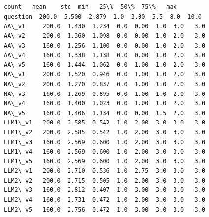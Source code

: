 \documentclass[11pt]{article}
\makeatletter
\newcommand{\boxspacing}{\kern\kvtcb@left@rule\kern\kvtcb@boxsep}
\newcommand{\prompt}[4]{
        {\ttfamily\llap{{\color{#2}[#3]:\hspace{3pt}#4}}\vspace{-\baselineskip}}
    }
\makeatother
\begin{document}
    \begin{center}
    \end{center}
    { \hspace*{\fill} \\}
    
    \begin{center}
    \end{center}
    { \hspace*{\fill} \\}
    
            \begin{tcolorbox}[breakable, size=fbox, boxrule=.5pt, pad at break*=1mm, opacityfill=0]
\prompt{Out}{outcolor}{50}{\boxspacing}
\begin{Verbatim}[commandchars=\\\{\}]
          count   mean    std  min   25\%  50\%  75\%   max
question  200.0  5.500  2.879  1.0  3.00  5.5  8.0  10.0
AA\_v1     200.0  1.430  1.234  0.0  0.00  1.0  3.0   3.0
AA\_v2     200.0  1.360  1.098  0.0  0.00  1.0  2.0   3.0
AA\_v3     160.0  1.256  1.100  0.0  0.00  1.0  2.0   3.0
AA\_v4     160.0  1.338  1.138  0.0  0.00  1.0  2.0   3.0
AA\_v5     160.0  1.444  1.062  0.0  1.00  1.0  2.0   3.0
NA\_v1     200.0  1.520  0.946  0.0  1.00  1.0  2.0   3.0
NA\_v2     200.0  1.270  0.837  0.0  1.00  1.0  2.0   3.0
NA\_v3     160.0  1.269  0.895  0.0  1.00  1.0  2.0   3.0
NA\_v4     160.0  1.400  1.023  0.0  1.00  1.0  2.0   3.0
NA\_v5     160.0  1.406  1.134  0.0  0.00  1.5  2.0   3.0
LLM1\_v1   200.0  2.585  0.542  1.0  2.00  3.0  3.0   3.0
LLM1\_v2   200.0  2.585  0.542  1.0  2.00  3.0  3.0   3.0
LLM1\_v3   160.0  2.569  0.600  1.0  2.00  3.0  3.0   3.0
LLM1\_v4   160.0  2.569  0.600  1.0  2.00  3.0  3.0   3.0
LLM1\_v5   160.0  2.569  0.600  1.0  2.00  3.0  3.0   3.0
LLM2\_v1   200.0  2.710  0.536  1.0  2.75  3.0  3.0   3.0
LLM2\_v2   200.0  2.715  0.505  1.0  2.00  3.0  3.0   3.0
LLM2\_v3   160.0  2.812  0.407  1.0  3.00  3.0  3.0   3.0
LLM2\_v4   160.0  2.731  0.472  1.0  2.00  3.0  3.0   3.0
LLM2\_v5   160.0  2.756  0.472  1.0  3.00  3.0  3.0   3.0
\end{Verbatim}
\end{tcolorbox}
        
\end{document}
